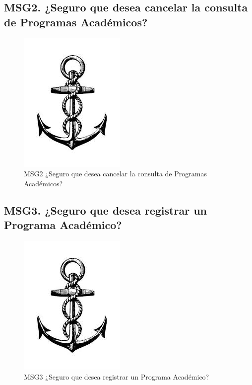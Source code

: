 \subsection{MSG2. ¿Seguro que desea cancelar la consulta de Programas Académicos?}
    \begin{figure}[htbp]
        \begin{center}
            \includegraphics[width=.4\textwidth]{images/MSG/ancla}
            \caption{MSG2 ¿Seguro que desea cancelar la consulta de Programas Académicos?}
            \label{fig:MSG2}
        \end{center}
    \end{figure}

\subsection{MSG3. ¿Seguro que desea registrar un Programa Académico?}
    \begin{figure}[htbp]
        \begin{center}
            \includegraphics[width=.4\textwidth]{images/MSG/ancla}
            \caption{MSG3 ¿Seguro que desea registrar un Programa Académico?}
            \label{fig:MSG3}
        \end{center}
    \end{figure}

